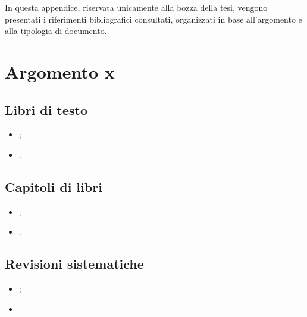 
In questa appendice, riservata unicamente alla bozza della tesi, vengono presentati i riferimenti bibliografici consultati, organizzati in base all'argomento e alla tipologia di documento.

\section*{Argomento x}

\subsection*{Libri di testo}
\begin{itemize}

\item \cite{};

\item \cite{}.

\end{itemize}

\subsection*{Capitoli di libri}
\begin{itemize}

\item \cite{};

\item \cite{}.

\end{itemize}

\subsection*{Revisioni sistematiche}
\begin{itemize}

\item \cite{};

\item \cite{}.

\end{itemize}

